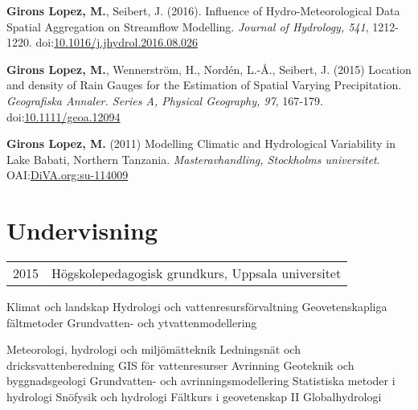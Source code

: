 \documentclass[]{gironslopez-resume-se}
\begin{document}
\begin{minipage}[t]{0.66\textwidth}
    \sectionsep

    \textbf{Girons Lopez, M.}, Seibert, J. (2016). Influence of Hydro-Meteorological Data Spatial Aggregation on Streamflow Modelling. \textit{Journal of Hydrology, 541}, 1212-1220. doi:\href{http://www.sciencedirect.com/science/article/pii/S0022169416305170}{10.1016/j.jhydrol.2016.08.026}
    
    \sectionsep
    
    \textbf{Girons Lopez, M.}, Wennerstr\"{o}m, H., Nord\'{e}n, L.-\r{A}., Seibert, J. (2015) Location and density of Rain Gauges for the Estimation of Spatial Varying Precipitation. \textit{Geografiska Annaler. Series A, Physical Geography, 97}, 167-179. doi:\href{http://onlinelibrary.wiley.com/doi/10.1111/geoa.12094}{10.1111/geoa.12094}
    
    \sectionsep
    
    \textbf{Girons Lopez, M.} (2011) Modelling Climatic and Hydrological Variability in Lake Babati, Northern Tanzania. \textit{Masteravhandling, Stockholms universitet}. OAI:\href{http://www.diva-portal.org/smash/record.jsf?pid=diva2\%3A788849\&dswid=\_new}{DiVA.org:su-114009}

    \sectionsep

    \section{Undervisning}

    \begin{tabular}{ll}
      2015 & Högskolepedagogisk grundkurs, Uppsala universitet
    \end{tabular}

    \sectionsep
    
    Klimat och landskap \textbullet{} Hydrologi och vattenresursförvaltning \textbullet{} Geovetenskapliga fältmetoder \textbullet{} Grundvatten- och ytvattenmodellering
    
    \sectionsep
    
    Meteorologi, hydrologi och miljömätteknik \textbullet{} Ledningsnät och dricksvattenberedning \textbullet{} GIS för vattenresurser \textbullet{} Avrinning \textbullet{} Geoteknik och byggnadsgeologi \textbullet{} Grundvatten- och avrinningsmodellering \textbullet{} Statistiska metoder i hydrologi \textbullet{} Snöfysik och hydrologi \textbullet{} Fältkurs i geovetenskap II \textbullet{} Globalhydrologi

  \end{minipage}

  
\end{document}
